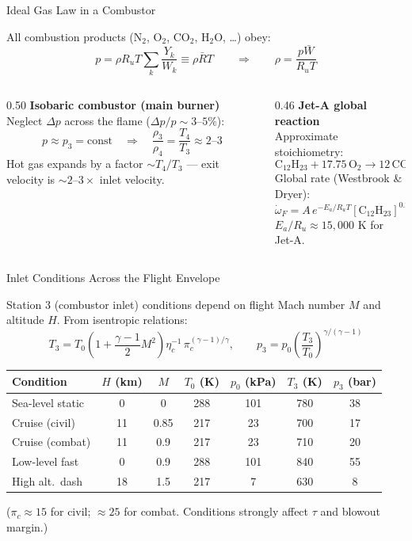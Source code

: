 \documentclass[12pt,aspectratio=169]{beamer}
\newcommand{\taures}{\tau}
\begin{document}
\begin{frame}{Ideal Gas Law in a Combustor}

  All combustion products (N$_2$, O$_2$, CO$_2$, H$_2$O, \ldots) obey:
  \[
    p = \rho R_u T \sum_k \frac{Y_k}{W_k} \equiv \rho \bar{R} T
    \qquad \Rightarrow \qquad
    \rho = \frac{p\bar{W}}{R_u T}
  \]

  \begin{columns}[t]
    \begin{column}{0.50\textwidth}
      \textbf{Isobaric combustor (main burner)}\\[4pt]
      Neglect $\Delta p$ across the flame ($\Delta p/p \sim 3$--$5\%$):
      \[
        p \approx p_3 = \text{const}
        \quad\Rightarrow\quad
        \frac{\rho_3}{\rho_4} = \frac{T_4}{T_3} \approx 2\text{--}3
      \]
      Hot gas expands by a factor $\sim T_4/T_3$ ---
      exit velocity is $\sim 2$--$3\times$ inlet velocity.
    \end{column}
    \begin{column}{0.46\textwidth}
      \textbf{Jet-A global reaction}\\[4pt]
      Approximate stoichiometry:
      \[
        \text{C}_{12}\text{H}_{23} + 17.75\,\text{O}_2
        \to 12\,\text{CO}_2 + 11.5\,\text{H}_2\text{O}
      \]
      Global rate (Westbrook \& Dryer):
      \[
        \dot{\omega}_F \!=\! A\,e^{-E_a/R_u T}
        [\text{C}_{12}\text{H}_{23}]^{0.25}[\text{O}_2]^{1.5}
      \]
      $E_a/R_u \approx 15{,}000$ K for Jet-A.
    \end{column}
  \end{columns}
\end{frame}

\begin{frame}{Inlet Conditions Across the Flight Envelope}

  Station 3 (combustor inlet) conditions depend on flight Mach number $M$
  and altitude $H$.  From isentropic relations:
  \[
    T_3 = T_0\left(1 + \frac{\gamma-1}{2}M^2\right)\!\eta_c^{-1}\,\pi_c^{(\gamma-1)/\gamma},
    \qquad
    p_3 = p_0\left(\frac{T_3}{T_0}\right)^{\gamma/(\gamma-1)}
  \]

  \medskip
  \renewcommand{\arraystretch}{1.3}
  \begin{tabular}{lcccccc}
    \toprule
    Condition & $H$ (km) & $M$ & $T_0$ (K) & $p_0$ (kPa) & $T_3$ (K) & $p_3$ (bar) \\
    \midrule
    Sea-level static & 0   & 0   & 288 & 101 & 780 & 38 \\
    Cruise (civil)   & 11  & 0.85& 217 & 23  & 700 & 17 \\
    Cruise (combat)  & 11  & 0.9 & 217 & 23  & 710 & 20 \\
    Low-level fast   & 0   & 0.9 & 288 & 101 & 840 & 55 \\
    High alt.\ dash  & 18  & 1.5 & 217 & 7   & 630 & 8  \\
    \bottomrule
  \end{tabular}

  \medskip
  \small ($\pi_c \approx 15$ for civil; $\approx 25$ for combat.
  Conditions strongly affect $\taures$ and blowout margin.)
\end{frame}
\end{document}

